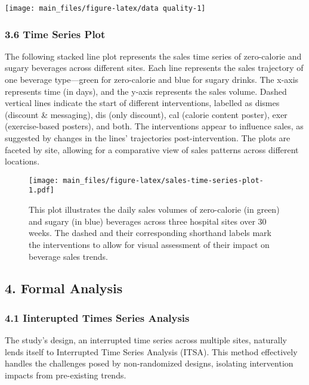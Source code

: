 \documentclass[
]{article}
\begin{document}
\begin{center}\texttt{[image: main\_files/figure-latex/data quality-1]} \end{center}

\hypertarget{time-series-plot}{%
\subsubsection{3.6 Time Series Plot}\label{time-series-plot}}

The following stacked line plot represents the sales time series of
zero-calorie and sugary beverages across different sites. Each line
represents the sales trajectory of one beverage type---green for
zero-calorie and blue for sugary drinks. The x-axis represents time (in
days), and the y-axis represents the sales volume. Dashed vertical lines
indicate the start of different interventions, labelled as dismes
(discount \& messaging), dis (only discount), cal (calorie content
poster), exer (exercise-based posters), and both. The interventions
appear to influence sales, as suggested by changes in the lines'
trajectories post-intervention. The plots are faceted by site, allowing
for a comparative view of sales patterns across different locations.

\begin{figure}
\centering
\texttt{[image: main\_files/figure-latex/sales-time-series-plot-1.pdf]}
\caption{This plot illustrates the daily sales volumes of zero-calorie
(in green) and sugary (in blue) beverages across three hospital sites
over 30 weeks. The dashed and their corresponding shorthand labels mark
the interventions to allow for visual assessment of their impact on
beverage sales trends.}
\end{figure}

\hypertarget{formal-analysis}{%
\subsection{4. Formal Analysis}\label{formal-analysis}}

\hypertarget{iinterupted-times-series-analysis}{%
\subsubsection{4.1 Iinterupted Times Series
Analysis}\label{iinterupted-times-series-analysis}}

The study's design, an interrupted time series across multiple sites,
naturally lends itself to Interrupted Time Series Analysis (ITSA). This
method effectively handles the challenges posed by non-randomized
designs, isolating intervention impacts from pre-existing trends.
\end{document}

